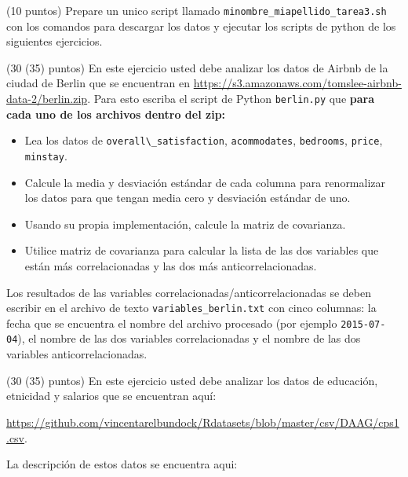 \documentclass[11pt,letterpaper]{exam}
\begin{document}
\begin{questions}




(10 puntos) 
Prepare un unico script llamado \verb"minombre_miapellido_tarea3.sh" 
con los comandos para descargar los datos y ejecutar los scripts de python
de los siguientes ejercicios.


(30 (35) puntos) En este ejercicio usted debe analizar los datos de Airbnb
    de la ciudad de Berlin que se encuentran en
    \url{https://s3.amazonaws.com/tomslee-airbnb-data-2/berlin.zip}. 
    Para esto escriba el script de Python \verb"berlin.py" que
    {\bf para cada uno de los archivos dentro del zip:}\\
    \begin{itemize}
    \item {Lea los datos de \verb"overall\_satisfaction", \verb"acommodates",
        \verb"bedrooms", \verb"price", \verb"minstay".}
    \item{Calcule la media y desviaci\'on est\'andar de cada columna
      para renormalizar los datos para que tengan media cero y
      desviaci\'on est\'andar de uno.}
    \item{Usando su propia implementaci\'on, calcule la matriz de
      covarianza.}
    \item{Utilice matriz de covarianza para calcular la lista de las
      dos variables que est\'an m\'as correlacionadas y las dos m\'as
      anticorrelacionadas.}
    \end{itemize}
    Los resultados de las variables
    correlacionadas/anticorrelacionadas se deben escribir en el
    archivo de texto \verb"variables_berlin.txt" con cinco columnas: la
    fecha que se encuentra el nombre del archivo procesado (por
    ejemplo \verb"2015-07-04"), el nombre
    de las dos variables correlacionadas y el nombre de las dos
    variables anticorrelacionadas. 




(30 (35) puntos) En este ejercicio usted debe analizar los datos de
educaci\'on, etnicidad y salarios que se encuentran aqu\'i:

\url{https://github.com/vincentarelbundock/Rdatasets/blob/master/csv/DAAG/cps1.csv}.

La descripci\'on de estos datos se encuentra aqui:


\end{questions}
\end{document}
